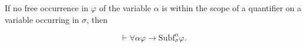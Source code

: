 If no free occurrence in $\varphi$ of the variable $\alpha$ is within the scope of a quantifier on a variable occurring in $\sigma$, then

$$\vdash \forall \alpha \varphi \rightarrow \text{Subf}_{\sigma}^{\alpha} \varphi.$$
